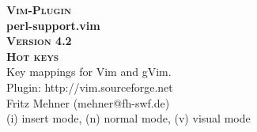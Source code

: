 \documentclass[oneside,10pt,landscape,DIV17]{scrartcl}
\newcommand{\Pluginversion}{4.2}
\begin{document}
%

\begin{multicols}{3}
%
\begin{center}
%
\textbf{\textsc{\small{Vim-Plugin}}}\\
\textbf{\LARGE{perl-support.vim}}\\
\textbf{\textsc{\small{Version \Pluginversion}}}\\
\vspace{5mm}%
\textbf{\textsc{\Huge{Hot keys}}}\\ 
\vspace{5mm}%
Key mappings for Vim and gVim.\\
Plugin: http://vim.sourceforge.net\\
Fritz Mehner (mehner@fh-swf.de)\\
\vspace{1.0mm}
{\normalsize (i)} insert mode, {\normalsize (n)} normal mode, {\normalsize (v)} visual mode\\
\vspace{4.0mm}


\end{center}
\end{multicols}
\end{document}
